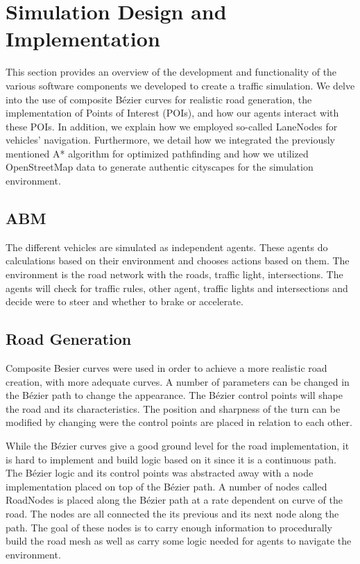 \section{Simulation Design and Implementation}

    This section provides an overview of the development and functionality of the various software components we developed to create a traffic simulation. We delve into the use of composite Bézier curves for realistic road generation, the implementation of Points of Interest (POIs), and how our agents interact with these POIs. In addition, we explain how we employed so-called LaneNodes for vehicles' navigation. Furthermore, we detail how we integrated the previously mentioned A* algorithm for optimized pathfinding and how we utilized OpenStreetMap data to generate authentic cityscapes for the simulation environment.

    \subsection{ABM}
        The different vehicles are simulated as independent agents. These agents do calculations based on their environment and chooses actions based on them. The environment is the road network with the roads, traffic light, intersections. The agents will check for traffic rules, other agent, traffic lights and intersections and decide were to steer and whether to brake or accelerate. 

    \subsection{Road Generation}
     Composite Besier curves were used in order to achieve a more realistic road creation,  with more adequate curves. A number of parameters can be changed in the Bézier path to change the appearance. The Bézier control points will shape the road and its characteristics. The position and sharpness of the turn can be modified by changing were the control points are placed in relation to each other. 
    
        While the Bézier curves give a good ground level for the road implementation, it is hard to implement and build logic based on it since it is a continuous path. The Bézier logic and its control points was abstracted away with a node implementation placed on top of the Bézier path. A number of nodes called RoadNodes is placed along the Bézier path at a rate dependent on curve of the road. The nodes are all connected the its previous and its next node along the path. The goal of these nodes is to carry enough information to procedurally  build the road mesh as well as carry some logic needed for agents to navigate the environment.
    
